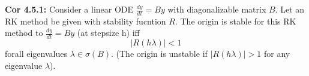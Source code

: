 \documentclass[10pt,a4paper]{article}
\begin{document}
\begin{multicols*}{2}
\textbf{Cor 4.5.1:} Consider a linear ODE $\frac{dy}{dt} = By$ with diagonalizable matrix $B$. Let an RK method be given with stability fucntion $R$. The origin is stable for this RK method to $\frac{dy}{dt} = By$ (at stepsize h) iff
\[
|R( h\lambda)| < 1    
\]
forall eigenvalues $\lambda \in \sigma(B)$. (The origin is unstable if $|R( h\lambda)| > 1 $ for any eigenvalue $\lambda$).

\end{multicols*}
\end{document}
